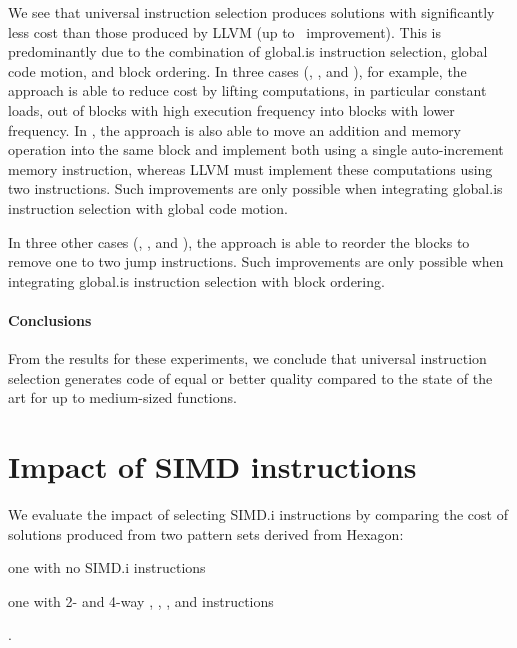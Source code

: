 We see that \gls{universal instruction selection} produces \glspl{solution} with
significantly less cost than those produced by \gls{LLVM} (up to~\printZCNorm{%
  \UnisonVsLlvmHexagonFiveCyclesSpeedupCyclesZeroCenteredSpeedupMax%
} improvement).
%
This is predominantly due to the combination of \gls{global.is}
\gls{instruction selection}, \gls{global code motion}, and \gls{block ordering}.
%
In three cases (, , and
), for example, the approach is able to reduce cost by lifting
computations, in particular constant loads, out of \glspl{block} with high
execution frequency into \glspl{block} with lower frequency.
%
In , the approach is also able to move an addition and
memory \gls{operation} into the same \gls{block} and implement both using a
single auto-increment memory \gls{instruction}, whereas \gls{LLVM} must
implement these computations using two \glspl{instruction}.
%
Such improvements are only possible when integrating \gls{global.is}
\gls{instruction selection} with \gls{global code motion}.

In three other cases (, ,
and ), the approach is able to reorder the
\glspl{block} to remove one to two jump \glspl{instruction}.
%
Such improvements are only possible when integrating \gls{global.is}
\gls{instruction selection} with \gls{block ordering}.


\paragraph{Conclusions}

From the results for these experiments, we conclude that \gls{universal
  instruction selection} generates code of equal or better quality compared to
the state of the art for up to medium-sized \glspl{function}.


\section{Impact of SIMD instructions}

We evaluate the impact of selecting \gls{SIMD.i} \glspl{instruction}
by comparing the cost of \glspl{solution} produced from two \glspl{pattern set}
derived from \gls{Hexagon}:
%
\begin{patternList}
  \item {}
    one with no \gls{SIMD.i} \glspl{instruction}
  \item {}
    one with \num{2}- and \num{4}-way , , ,
    and  \glspl{instruction}
\end{patternList}.


